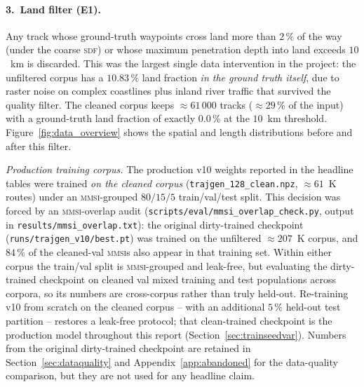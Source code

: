 \documentclass[oneside, a4paper, onecolumn, 11pt]{article}
\newcommand{\sdf}{\textsc{sdf}}
\begin{document}
\paragraph{3.~Land filter (E1).}
Any track whose ground-truth waypoints cross land more than $2\,\%$ of
the way (under the coarse \sdf) or whose maximum penetration depth
into land exceeds $10$~km is discarded.  This was the largest single
data intervention in the project: the unfiltered corpus has a
$10.83\,\%$ land fraction \emph{in the ground truth itself}, due to
raster noise on complex coastlines plus inland river traffic that
survived the quality filter.  The cleaned corpus keeps
$\approx 61\,000$ tracks ($\approx 29\,\%$ of the input) with a
ground-truth land fraction of exactly $0.0\,\%$ at the $10$~km
threshold.  Figure~\ref{fig:data_overview} shows the spatial and
length distributions before and after this filter.

\emph{Production training corpus.}
The production v10 weights reported in the headline tables were
trained \emph{on the cleaned corpus} (\texttt{trajgen\_128\_clean.npz},
$\approx 61$~K routes) under an \textsc{mmsi}-grouped $80/15/5$
train/val/test split.  This decision was forced by an
\textsc{mmsi}-overlap audit
(\texttt{scripts/eval/mmsi\_overlap\_check.py}, output in
\texttt{results/mmsi\_overlap.txt}): the original dirty-trained
checkpoint (\texttt{runs/trajgen\_v10/best.pt}) was trained on the
unfiltered $\approx 207$~K corpus, and $84\,\%$ of the cleaned-val
\textsc{mmsi}s also appear in that training set.  Within either
corpus the train/val split is \textsc{mmsi}-grouped and leak-free,
but evaluating the dirty-trained checkpoint on cleaned val mixed
training and test populations across corpora, so its numbers are
cross-corpus rather than truly held-out.  Re-training v10 from
scratch on the cleaned corpus -- with an additional $5\,\%$
held-out test partition -- restores a leak-free protocol; that
clean-trained checkpoint is the production model throughout this
report (Section~\ref{sec:trainseedvar}).  Numbers from the original
dirty-trained checkpoint are retained in
Section~\ref{sec:dataquality} and Appendix~\ref{app:abandoned} for
the data-quality comparison, but they are not used for any headline
claim.
\end{document}
